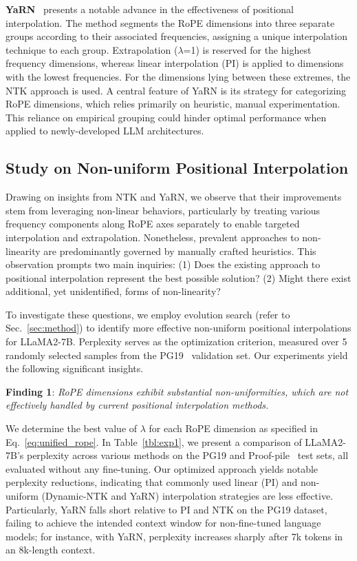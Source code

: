 \textbf{YaRN}~\cite{yarn} presents a notable advance in the effectiveness of positional interpolation. The method segments the RoPE dimensions into three separate groups according to their associated frequencies, assigning a unique interpolation technique to each group. Extrapolation ($\lambda$=1) is reserved for the highest frequency dimensions, whereas linear interpolation (PI) is applied to dimensions with the lowest frequencies. For the dimensions lying between these extremes, the NTK approach is used. A central feature of YaRN is its strategy for categorizing RoPE dimensions, which relies primarily on heuristic, manual experimentation. This reliance on empirical grouping could hinder optimal performance when applied to newly-developed LLM architectures.

\subsection{Study on Non-uniform Positional Interpolation}

Drawing on insights from NTK and YaRN, we observe that their improvements stem from leveraging non-linear behaviors, particularly by treating various frequency components along RoPE axes separately to enable targeted interpolation and extrapolation. Nonetheless, prevalent approaches to non-linearity are predominantly governed by manually crafted heuristics. This observation prompts two main inquiries: (1) Does the existing approach to positional interpolation represent the best possible solution? (2) Might there exist additional, yet unidentified, forms of non-linearity?

To investigate these questions, we employ evolution search (refer to Sec.~\ref{sec:method}) to identify more effective non-uniform positional interpolations for LLaMA2-7B. Perplexity serves as the optimization criterion, measured over 5 randomly selected samples from the PG19~\cite{pg19} validation set. Our experiments yield the following significant insights.

\textbf{Finding 1}: \textit{RoPE dimensions exhibit substantial non-uniformities, which are not effectively handled by current positional interpolation methods.}

We determine the best value of $\lambda$ for each RoPE dimension as specified in Eq.~\ref{eq:unified_rope}. In Table~\ref{tbl:exp1}, we present a comparison of LLaMA2-7B's perplexity across various methods on the PG19 and Proof-pile~\cite{proof-pile} test sets, all evaluated without any fine-tuning. Our optimized approach yields notable perplexity reductions, indicating that commonly used linear (PI) and non-uniform (Dynamic-NTK and YaRN) interpolation strategies are less effective. Particularly, YaRN falls short relative to PI and NTK on the PG19 dataset, failing to achieve the intended context window for non-fine-tuned language models; for instance, with YaRN, perplexity increases sharply after 7k tokens in an 8k-length context.


